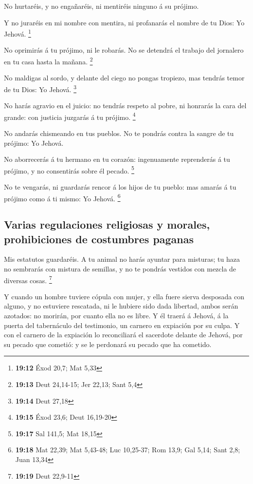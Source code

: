  No hurtaréis, y no engañaréis, ni mentiréis ninguno á su
prójimo.

 Y no juraréis en mi nombre con mentira, ni profanarás el
nombre de tu Dios: Yo Jehová. \footnote{\textbf{19:12} Éxod 20,7; Mat
  5,33}

 No oprimirás á tu prójimo, ni le robarás. No se detendrá
el trabajo del jornalero en tu casa hasta la mañana. \footnote{\textbf{19:13}
  Deut 24,14-15; Jer 22,13; Sant 5,4}

 No maldigas al sordo, y delante del ciego no pongas
tropiezo, mas tendrás temor de tu Dios: Yo Jehová. \footnote{\textbf{19:14}
  Deut 27,18}

 No harás agravio en el juicio: no tendrás respeto al
pobre, ni honrarás la cara del grande: con justicia juzgarás á tu
prójimo. \footnote{\textbf{19:15} Éxod 23,6; Deut 16,19-20}

 No andarás chismeando en tus pueblos. No te pondrás
contra la sangre de tu prójimo: Yo Jehová.

 No aborrecerás á tu hermano en tu corazón: ingenuamente
reprenderás á tu prójimo, y no consentirás sobre él pecado. \footnote{\textbf{19:17}
  Sal 141,5; Mat 18,15}

 No te vengarás, ni guardarás rencor á los hijos de tu
pueblo: mas amarás á tu prójimo como á ti mismo: Yo Jehová. \footnote{\textbf{19:18}
  Mat 22,39; Mat 5,43-48; Luc 10,25-37; Rom 13,9; Gal 5,14; Sant 2,8;
  Juan 13,34}

\hypertarget{varias-regulaciones-religiosas-y-morales-prohibiciones-de-costumbres-paganas}{%
\subsection{Varias regulaciones religiosas y morales, prohibiciones de
costumbres
paganas}\label{varias-regulaciones-religiosas-y-morales-prohibiciones-de-costumbres-paganas}}

 Mis estatutos guardaréis. A tu animal no harás ayuntar
para misturas; tu haza no sembrarás con mistura de semillas, y no te
pondrás vestidos con mezcla de diversas cosas. \footnote{\textbf{19:19}
  Deut 22,9-11}

 Y cuando un hombre tuviere cópula con mujer, y ella
fuere sierva desposada con alguno, y no estuviere rescatada, ni le
hubiere sido dada libertad, ambos serán azotados: no morirán, por cuanto
ella no es libre.  Y él traerá á Jehová, á la puerta del
tabernáculo del testimonio, un carnero en expiación por su culpa.
 Y con el carnero de la expiación lo reconciliará el
sacerdote delante de Jehová, por su pecado que cometió: y se le
perdonará su pecado que ha cometido.

